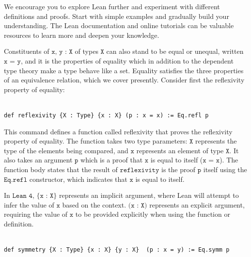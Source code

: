 \documentclass{book}
\newcounter{lcounter}
\begin{document}
We encourage you to explore Lean further and experiment with different definitions and proofs. Start with simple examples and gradually build your understanding. The Lean documentation and online tutorials can be valuable resources to learn more and deepen your knowledge.

Constituents of $\texttt{x, y : X}$ of types $\texttt{X}$ can also stand to be equal or unequal, written $\texttt{x = y}$, and it is the properties of equality which in addition to the dependent type theory make a type behave like a set. Equality satisfies the three properties of an equivalence relation, which we cover presently. Consider first the reflexivity property of equality:\\

\begin{center}
\begin{tcolorbox}[width=5in,colback={white},title={\begin{center}\texttt{Lean \thelcounter} \addtocounter{lcounter}{1}  \end{center}},colbacktitle=Blue,coltitle=black]
\begin{verbatim}

def reflexivity {X : Type} {x : X} (p : x = x) := Eq.refl p

\end{verbatim}
\end{tcolorbox}
\end{center}

This command defines a function called reflexivity that proves the reflexivity property of equality. The function takes two type parameters: $\texttt{X}$ represents the type of the elements being compared, and $\texttt{x}$ represents an element of type $\texttt{X}$. It also takes an argument $\texttt{p}$ which is a proof that $\texttt{x}$ is equal to itself ($\texttt{x = x}$). The function body states that the result of $\texttt{reflexivity}$ is the proof $\texttt{p}$ itself using the $\texttt{Eq.refl}$ constructor, which indicates that $\texttt{x}$  is equal to itself.

In $\texttt{Lean 4}$, $\{\texttt{x : X}\}$ represents an implicit argument, where Lean will attempt to infer the value of $\texttt{x}$ based on the context. $\texttt{(x : X)}$ represents an explicit argument, requiring the value of $\texttt{x}$ to be provided explicitly when using the function or definition.

\begin{center}
\begin{tcolorbox}[width=5in,colback={white},title={\begin{center}\texttt{Lean \thelcounter} \addtocounter{lcounter}{1}  \end{center}},colbacktitle=Blue,coltitle=black]
\begin{verbatim}

def symmetry {X : Type} {x : X} {y : X}  (p : x = y) := Eq.symm p

\end{verbatim}
\end{tcolorbox}
\end{center}
\end{document}

